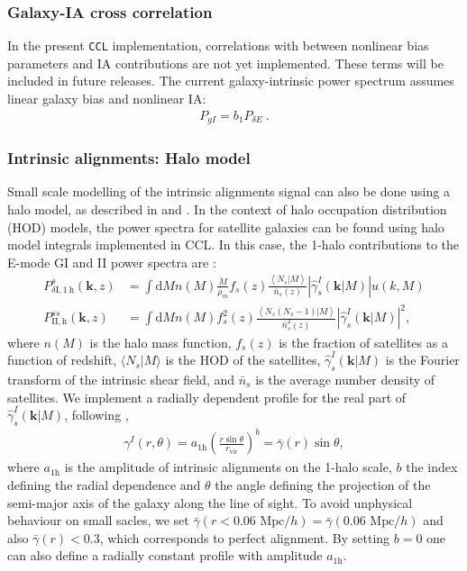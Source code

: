 \documentclass[\docopts]{\docclass}
\newcommand{\ccl}{{\tt CCL}\xspace}
\begin{document}
\subsubsection{Galaxy-IA cross correlation}

In the present \ccl implementation, correlations with between nonlinear bias parameters and IA contributions are not yet implemented. These terms will be included in future releases. The current galaxy-intrinsic power spectrum assumes linear galaxy bias and nonlinear IA:
\begin{align}
    P_{gI} = b_1 P_{\delta E}~.
\end{align}

\subsubsection{Intrinsic alignments: Halo model}

Small scale modelling of the intrinsic alignments signal can also be done using a halo model, as described in \cite{SchneiderBridle2010} and \cite{Fortuna2021}. In the context of halo occupation distribution (HOD) models, the power spectra for satellite galaxies can be found using halo model integrals implemented in CCL. In this case, the 1-halo contributions to the E-mode GI and II power spectra are \cite[Eq. 17, 18]{Fortuna2021}:
 \begin{align}
	P_{\delta \mathrm{I}, 1 \mathrm{~h}}^{s}(\mathbf{k}, z)&=\int \mathrm{d} M n(M) \frac{M}{\bar{\rho}_{m}} f_{s}(z) \frac{\left\langle N_{s} | M\right\rangle}{\bar{n}_{s}(z)}\left|\hat{\gamma}_{s}^{I}(\mathbf{k} | M)\right| u(k, M)\\
	P_{\mathrm{II}, \mathrm{h}}^{s s}(\mathbf{k}, z)&=\int \mathrm{d} M n(M) f_{s}^{2}(z) \frac{\left\langle N_{s}\left(N_{s}-1\right) | M\right\rangle}{\bar{n}_{s}^{2}(z)}\left|\hat{\gamma}_{s}^{I}(\mathbf{k} | M)\right|^{2},
  \label{eq:IAHaloModelPowerSpectra}
\end{align}
where $n(M)$ is the halo mass function, $f_s(z)$ is the fraction of satellites as a function of redshift, $\langle N_s|M\rangle$ is the HOD of the satellites, $\hat{\gamma}_s^I(\mathbf{k}|M)$ is the Fourier transform of the intrinsic shear field, and $\bar{n}_s$ is the average number density of satellites. We implement a radially dependent profile for the real part of $\hat{\gamma}_s^I(\mathbf{k}|M)$, following \cite{Fortuna2021},
 \begin{align}
	\gamma^I(r,\theta)=a_{1\mathrm{h}}\left(\frac{r\sin\theta}{r_\mathrm{vir}}\right)^b=\bar{\gamma}(r)\sin\theta,
\end{align}
where $a_{1\mathrm{h}}$ is the amplitude of intrinsic alignments on the 1-halo scale, $b$ the index defining the radial dependence and $\theta$ the angle defining the projection of the semi-major axis of the galaxy along the line of sight. To avoid unphysical behaviour on small sacles, we set $\bar{\gamma}(r<0.06\text{ Mpc}/h)=\bar{\gamma}(0.06\text{ Mpc}/h)$ and also $\bar{\gamma}(r)<0.3$, which corresponds to perfect alignment. By setting $b=0$ one can also define a radially constant profile with amplitude $a_{1\mathrm{h}}$.
\end{document}
